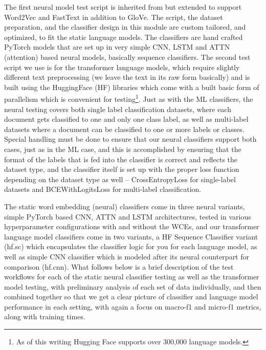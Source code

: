 \documentclass[final]{clv2025}
\begin{document}
The first neural model test script is inherited from \cite{moreo} but extended to support Word2Vec and FastText in addition to GloVe. The script, the dataset preparation, and the classifier design in this module are custom tailored, and optimized, to fit the static language models. The classifiers are hand crafted PyTorch models that are set up in very simple CNN, LSTM and ATTN (attention) based neural models, basically sequence classifiers. The second test script we use is for the transformer language models, which require slightly different text preprocessing (we leave the text in its raw form basically) and is built using the HuggingFace (HF) libraries which come with a built basic form of parallelism which is convenient for testing\footnote{  As of this writing Hugging Face supports over 300,000 language models.}.  
Just as with the ML classifiers, the neural testing covers both single label classification datasets, where each document gets classified to one and only one class label, as well as multi-label datasets where a document can be classified to one or more labels or classes. Special handling must be done to ensure that our neural classifiers support both cases, just as in the ML case, and this is accomplished by ensuring that the format of the labels that is fed into the classifier is correct and reflects the dataset type, and the classifier itself is set up with the proper loss function depending on the dataset type as well – CrossEntropyLoss for single-label datasets and BCEWithLogitsLoss for multi-label classification.

The static word embedding (neural) classifiers come in three neural variants, simple PyTorch based CNN, ATTN and LSTM architectures, tested in various hyperparameter configurations with and without the WCEs, and our transformer language model classifiers come in two variants, a HF Sequence Classifier variant (hf.sc) which encapsulates the classifier logic for you for each language model, as well as simple CNN classifier which is modeled after its neural counterpart for comparison (hf.cnn). What follows below is a brief description of the test workflows for each of the static neural classifier testing as well as the transformer model testing, with preliminary analysis of each set of data individually, and then combined together so that we get a clear picture of classifier and language model performance in each setting, with again a focus on macro-f1 and micro-f1 metrics, along with training times. 
\end{document}
